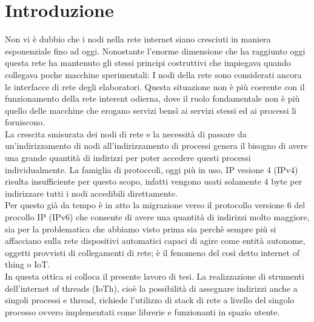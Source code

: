 

\chapter*{Introduzione}                 %


Non vi \`e dubbio che i nodi nella rete internet siano cresciuti in maniera esponenziale fino ad oggi. Nonostante l'enorme dimensione che ha raggiunto oggi questa rete ha mantenuto gli stessi principi costruttivi che impiegava quando collegava poche macchine sperimentali: I nodi della rete sono considerati ancora le interfacce di rete degli elaboratori. Questa situazione non \`e pi\`u coerente con il funzionamento della rete interent odierna, dove il ruolo fondamentale non \`e pi\`u quello delle macchine che erogano servizi bens\`i ai servizi stessi ed ai processi li forniscono.\\
La crescita smisurata dei nodi di rete e la necessit\`a di passare da un'indirizzamento di nodi all'indirizzamento di processi genera il bisogno di avere una grande quantit\`a di indirizzi per poter accedere questi processi individualmente. La famiglia di protoccoli, oggi pi\`u in uso, IP vesione 4 (IPv4) risulta insufficiente per questo scopo, infatti vengono usati solamente 4 byte per indirizzare tutti i nodi accedibili direttamente.\\
Per questo gi\`a da tempo \`e in atto la migrazione verso il protocollo versione 6 del procollo IP (IPv6) che consente di avere una quantit\`a di indirizzi molto maggiore, sia per la problematica che abbiamo visto prima sia perch\`e sempre pi\`u si affacciano sulla rete dispositivi automatici capaci di agire come entit\`a autonome, oggetti provvisti di collegamenti di rete; \`e il fenomeno del cos\`i detto internet of thing o IoT.\\
In questa ottica si colloca il presente lavoro di tesi. La realizzazione di strumenti dell'internet of threads (IoTh), cio\`e la possibilit\`a di assegnare indirizzi anche a singoli processi e thread, richiede l'utilizzo di stack di rete a livello del singolo processo ovvero implementati come librerie e funzionanti in spazio utente.\\
